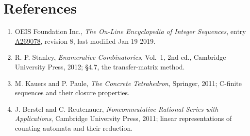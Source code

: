 \documentclass[11pt]{article}
\theoremstyle{definition}
\begin{document}
\section{References}

\begin{enumerate}

\item OEIS Foundation Inc., \emph{The On-Line Encyclopedia of Integer Sequences}, entry \href{https://oeis.org/A269078}{A269078}, revision 8, last modified Jan 19 2019.

\item R. P. Stanley, \emph{Enumerative Combinatorics}, Vol.~1, 2nd ed., Cambridge University Press, 2012; \S4.7, the transfer-matrix method.

\item M. Kauers and P. Paule, \emph{The Concrete Tetrahedron}, Springer, 2011; C-finite sequences and their closure properties.

\item J. Berstel and C. Reutenauer, \emph{Noncommutative Rational Series with Applications}, Cambridge University Press, 2011; linear representations of counting automata and their reduction.

\end{enumerate}
\end{document}

